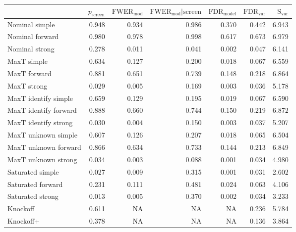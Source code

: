 
\newcommand{\guarantee}[1]{{\color{blue} #1}}
\begin{tabular}{|l|rrrrrr|}
 \hline
{} &  $p_{\text{screen}}$ &  $\text{FWER}_{\text{mod}}$ &  $\text{FWER}_{\text{mod}} \vert \text{screen}$ &  $\text{FDR}_{\text{model}}$ &  $\text{FDR}_{\text{var}}$ &  $\text{S}_{\text{var}}$ \\ \hline
Nominal simple & 0.948 & 0.934 & 0.986 & 0.370 & 0.442 & 6.943 \\ 
Nominal forward & 0.980 & 0.978 & 0.998 & 0.617 & 0.673 & 6.979 \\ 
Nominal strong & 0.278 & 0.011 & 0.041 & 0.002 & 0.047 & 6.141 \\ 
MaxT simple & 0.634 & \guarantee{0.127} & \guarantee{0.200} & \guarantee{0.018} & 0.067 & 6.559 \\ 
MaxT forward & 0.881 & 0.651 & 0.739 & \guarantee{0.148} & 0.218 & 6.864 \\ 
MaxT strong & 0.029 & \guarantee{0.005} & 0.169 & \guarantee{0.003} & 0.036 & 5.178 \\ 
MaxT identify simple & 0.659 & \guarantee{0.129} & \guarantee{0.195} & \guarantee{0.019} & 0.067 & 6.590 \\ 
MaxT identify forward & 0.888 & 0.660 & 0.744 & \guarantee{0.150} & 0.219 & 6.872 \\ 
MaxT identify strong & 0.030 & \guarantee{0.004} & 0.150 & \guarantee{0.003} & 0.037 & 5.207 \\ 
MaxT unknown simple & 0.607 & \guarantee{0.126} & \guarantee{0.207} & \guarantee{0.018} & 0.065 & 6.504 \\ 
MaxT unknown forward & 0.866 & 0.634 & 0.733 & \guarantee{0.144} & 0.213 & 6.849 \\ 
MaxT unknown strong & 0.034 & \guarantee{0.003} & 0.088 & \guarantee{0.001} & 0.034 & 4.980 \\ 
Saturated simple & 0.027 & 0.009 & 0.315 & 0.001 & 0.031 & 2.602 \\ 
Saturated forward & 0.231 & 0.111 & 0.481 & 0.024 & 0.063 & 4.106 \\ 
Saturated strong & 0.013 & 0.005 & 0.370 & 0.002 & 0.034 & 3.233 \\ 
Knockoff & 0.611 & NA & NA & NA & 0.236 & 5.784 \\ 
Knockoff+ & 0.378 & NA & NA & NA & \guarantee{0.136} & 3.864 \\   \hline
\end{tabular}